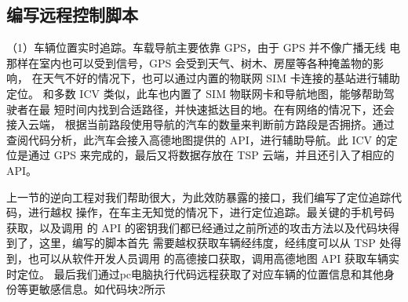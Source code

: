 \subsection{编写远程控制脚本}
（1）车辆位置实时追踪。车载导航主要依靠 GPS，由于 GPS 并不像广播无线
电那样在室内也可以受到信号，GPS 会受到天气、树木、房屋等各种掩盖物的影响，
在天气不好的情况下，也可以通过内置的物联网 SIM 卡连接的基站进行辅助定位。
和多数 ICV 类似，此车也内置了 SIM 物联网卡和导航地图，能够帮助驾驶者在最
短时间内找到合适路径，并快速抵达目的地。在有网络的情况下，还会接入云端，
根据当前路段使用导航的汽车的数量来判断前方路段是否拥挤。通过查阅代码分析，此汽车会接入高德地图提供的 API，进行辅助导航。此 ICV 的定位是通过
GPS 来完成的，最后又将数据存放在 TSP 云端，并且还引入了相应的 API。

上一节的逆向工程对我们帮助很大，为此效防暴露的接口，我们编写了定位追踪代码，进行越权
操作，在车主无知觉的情况下，进行定位追踪。最关键的手机号码获取，以及调用
的 API 的密钥我们都已经通过之前所述的攻击方法以及代码块得到了，这里，编写的脚本首先
需要越权获取车辆经纬度，经纬度可以从 TSP 处得到，也可以从软件开发人员调用
的高德接口获取，调用高德地图 API 获取车辆实时定位。
最后我们通过pc电脑执行代码远程获取了对应车辆的位置信息和其他身份等更敏感信息。如代码块2所示

